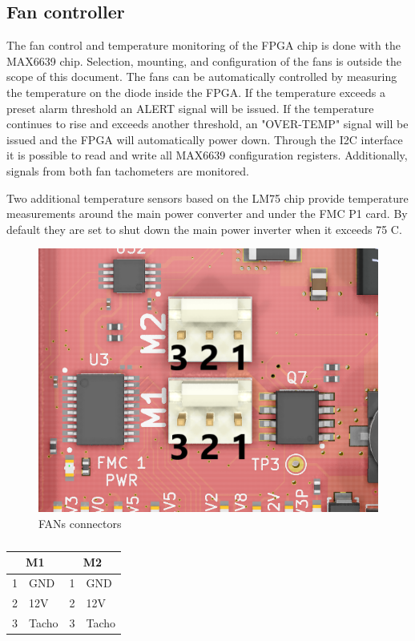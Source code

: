 \documentclass[12pt,oneside,a4]{article}
\begin{document}
\subsection{Fan controller}
The fan control and temperature monitoring of the FPGA chip is done with the MAX6639 chip. Selection, mounting, and configuration of the fans is outside the scope of this document. The fans can be automatically controlled by measuring the temperature on the diode inside the FPGA. If the temperature exceeds a preset alarm threshold an ALERT signal will be issued. If the temperature continues to rise and exceeds another threshold, an "OVER-TEMP" signal will be issued and the FPGA will automatically power down. Through the I2C interface it is possible to read and write all MAX6639 configuration registers. Additionally, signals from both fan tachometers are monitored.

Two additional temperature sensors based on the LM75 chip provide temperature measurements around the main power converter and under the FMC P1 card. By default they are set to shut down the main power inverter when it exceeds 75 C.

\begin{figure}[H]
\begin{center}
\includegraphics[width=0.6\linewidth]{fans.png}
 \caption{FANs connectors}\label{fans}
\end{center}
\end{figure}

\begin{table}[htbp]
\centering
\begin{tabular}{@{}llll@{}}
\toprule
\multicolumn{2}{c}{\textbf{M1}} & \multicolumn{2}{c}{\textbf{M2}} \\ \midrule
1            & GND              & 1            & GND              \\
2            & 12V              & 2            & 12V              \\
3            & Tacho            & 3            & Tacho            \\ \bottomrule
\end{tabular}
\caption{}
\label{tab:my-table}
\end{table}
\end{document}
